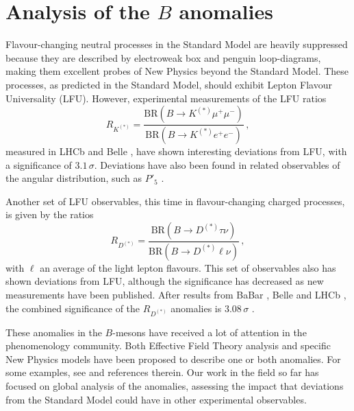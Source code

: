 \documentclass[12pt, a4paper]{article}
\begin{document}
\section{Analysis of the $B$ anomalies}
Flavour-changing neutral processes in the Standard Model are heavily suppressed because they are described by electroweak box and penguin loop-diagrams, making them excellent probes of New Physics beyond the Standard Model. These processes, as predicted in the Standard Model, should exhibit Lepton Flavour Universality (LFU). However, experimental measurements of the LFU ratios
\begin{equation}
R_{K^{(*)}} = \frac{\mathrm{BR}(B\to K^{(*)}\mu^+ \mu^-)}{\mathrm{BR}(B\to K^{(*)}e^+ e^-)}\,,
\end{equation}
measured in LHCb \cite{LHCb:2014vgu,LHCb:2017avl,LHCb:2019hip,LHCb:2021trn,LHCb:2021lvy} and Belle \cite{Belle:2019oag,BELLE:2019xld}, have shown interesting deviations from LFU, with a significance of $3.1\,\sigma$\cite{LHCb:2021trn}. Deviations have also been found in related observables of the angular distribution, such as $P'_5$ \cite{LHCb:2013ghj,LHCb:2014cxe,LHCb:2015svh,LHCb:2016ykl,LHCb:2020lmf,Belle:2016xuo,Belle:2016fev}.

Another set of LFU observables, this time in flavour-changing charged processes, is given by the ratios
\begin{equation}
R_{D^{(*)}} = \frac{\mathrm{BR}(B\to D^{(*)} \tau \nu)}{\mathrm{BR}(B\to D^{(*)} \ell \nu)}\,,
\end{equation}
with $\ell$ an average of the light lepton flavours. This set of observables also has shown deviations from LFU, although the significance has decreased as new measurements have been published. After results from BaBar \cite{BaBar:2012obs}, Belle \cite{Belle:2009xqm,Belle:2015qfa,Belle:2016dyj,Belle:2019gij} and LHCb \cite{LHCb:2015gmp,LHCb:2017smo}, the combined significance of the $R_{D^{(*)}}$ anomalies is $3.08\,\sigma$ \cite{HFLAV:2019otj}.

These anomalies in the $B$-mesons have received a lot of attention in the phenomenology community. Both Effective Field Theory analysis and specific New Physics models have been proposed to describe one or both anomalies. For some examples, see \cite{Alda:2018mfy,Alda:2020okk,Alda:2021ruz,Alda:2021rgt,Alda:2021krg} and references therein. Our work in the field so far has focused on global analysis of the anomalies, assessing the impact that deviations from the Standard Model could have in other experimental observables.
\end{document}

